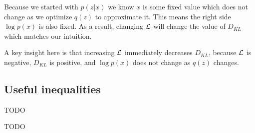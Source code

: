 Because we started with $p(z|x)$ we know $x$ is some fixed value which does not change as we optimize $q(z)$ to approximate it. This means the right side $\log p(x)$ is also fixed. As a result, changing ${\mathcal{L}}$ will change the value of $D_{KL}$ which matches our intuition.

A key insight here is that increasing ${\mathcal{L}}$ immediately decreases $D_{KL}$, because ${\mathcal{L}}$ is negative, $D_{KL}$ is positive, and $\log p(x)$ does not change as $q(z)$ changes.

\subsection{Useful inequalities}

\begin{thm}
TODO
\end{thm}

\begin{thm}
TODO
\end{thm}

\begin{thm}
\end{thm}
